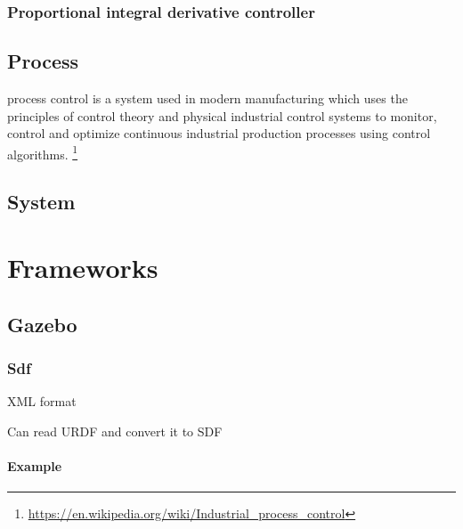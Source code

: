 \documentclass{book}
\providecommand{\seeherefooter}[1]{\footnote{\url{#1}}}
\begin{document}
\subsection{Proportional integral derivative controller}


%

\section{Process}


process control is a system used in modern manufacturing which uses the principles of control theory and physical industrial control systems to monitor, control and optimize continuous industrial production processes using control algorithms. \seeherefooter{https://en.wikipedia.org/wiki/Industrial_process_control}

\section{System}


%

\chapter{Frameworks}

\section{Gazebo}

\subsection{Sdf}


XML format
    
    Can read URDF and convert it to SDF

\subsubsection{Example}

\end{document}
